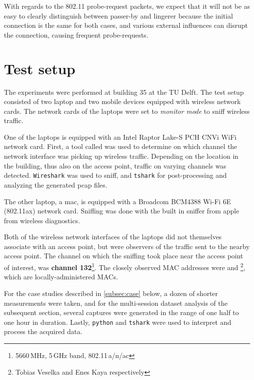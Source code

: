 \documentclass[twocolumn]{article}
\begin{document}
With regards to the 802.11 probe-request packets, we expect that it will not be as easy to clearly distinguish between passer-by and lingerer because the initial connection is the same for both cases, and various external influences can disrupt the connection, causing frequent probe-requests.




\section{Test setup}
\label{sec:test_setup}
The experiments were performed at building 35 at the TU Delft. The test setup consisted of two laptop and two mobile devices equipped with wireless network cards. The network cards of the laptops were set to \emph{monitor mode} to sniff wireless traffic.

One of the laptops is equipped with an Intel Raptor Lake-S PCH CNVi WiFi network card. First, a tool called \texttt{} was used to determine on which channel the network interface was picking up wireless traffic. Depending on the location in the building, thus also on the access point, traffic on varying channels was detected. \texttt{Wireshark} was used to sniff, and \texttt{tshark} for post-processing and analyzing the generated pcap files.

The other laptop, a mac, is equipped with a Broadcom BCM4388 Wi-Fi 6E (802.11ax) network card. Sniffing was done with the built in sniffer from apple from wireless diagnostics.

Both of the wireless network interfaces of the laptops did not themselves associate with an access point, but were observers of the traffic sent to the nearby access point. The channel on which the sniffing took place near the access point of interest, was \textbf{channel 132}\footnote{5660\,MHz, 5\,GHz band, 802.11\,a/n/ac}. The closely observed MAC addresses were \texttt{} and \texttt{}\footnote{Tobias Veselka and Enes Kaya respectively}, which are locally-administered MACs.

For the case studies described in \autoref{subsec:case} below, a dozen of shorter measurements were taken, and for the multi-session dataset analysis of the subsequent section, several captures were generated in the range of one half to one hour in duration. Lastly, \texttt{python} and \texttt{tshark} were used to interpret and process the acquired data.
\end{document}
